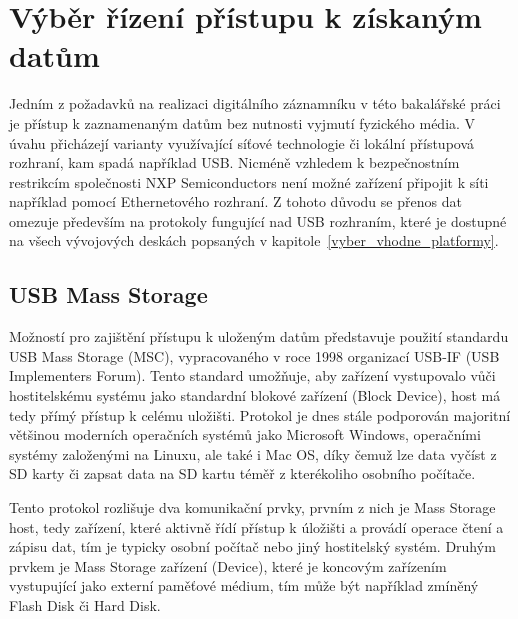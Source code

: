 
\section{Výběr řízení přístupu k získaným datům}
\label{vyber_rizeni_pristupu_k_ziskanym_datum}
Jedním z požadavků na realizaci digitálního záznamníku v této bakalářské práci je přístup k zaznamenaným datům bez nutnosti vyjmutí fyzického média. V úvahu přicházejí varianty využívající síťové technologie či lokální přístupová rozhraní, kam spadá například USB. Nicméně vzhledem k bezpečnostním restrikcím společnosti NXP Semiconductors není možné zařízení připojit k síti například pomocí Ethernetového rozhraní. Z tohoto důvodu se přenos dat omezuje především na protokoly fungující nad USB rozhraním, které je dostupné na všech vývojových deskách popsaných v kapitole~\ref{vyber_vhodne_platformy}.


\subsection{USB Mass Storage}
\label{usb_mass_storage}
Možností pro zajištění přístupu k uloženým datům představuje použití standardu USB Mass Storage (MSC), vypracovaného v roce 1998 organizací USB-IF (USB Implementers Forum). Tento standard umožňuje, aby zařízení vystupovalo vůči hostitelskému systému jako standardní blokové zařízení (Block Device), host má tedy přímý přístup k celému uložišti. Protokol je dnes stále podporován majoritní většinou moderních operačních systémů jako Microsoft Windows, operačními systémy založenými na Linuxu, ale také i Mac OS, díky čemuž lze data vyčíst z SD karty či zapsat data na SD kartu téměř z kterékoliho osobního počítače.

Tento protokol rozlišuje dva komunikační prvky, prvním z nich je Mass Storage host, tedy zařízení, které aktivně řídí přístup k úložišti a provádí operace čtení a zápisu dat, tím je typicky osobní počítač nebo jiný hostitelský systém. Druhým prvkem je Mass Storage zařízení (Device), které je koncovým zařízením vystupující jako externí paměťové médium, tím může být například zmíněný Flash Disk či Hard Disk.

